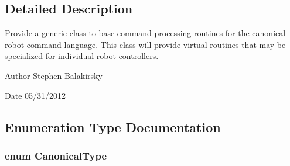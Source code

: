 \subsection{Detailed Description}
Provide a generic class to base command processing routines for the canonical robot command language. This class will provide virtual routines that may be specialized for individual robot controllers. \begin{DoxyAuthor}{Author}
Stephen Balakirsky 
\end{DoxyAuthor}
\begin{DoxyDate}{Date}
05/31/2012 
\end{DoxyDate}


\subsection{Enumeration Type Documentation}
\hypertarget{canonical_msg_8hh_a82f10f8fe974cf1c4a8c7459b963ffeb}{
\subsubsection[{CanonicalType}]{\setlength{\rightskip}{0pt plus 5cm}enum {\bf CanonicalType}}}
\label{canonical_msg_8hh_a82f10f8fe974cf1c4a8c7459b963ffeb}
